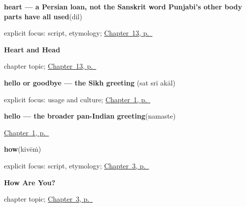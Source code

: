 \noindent\begin{minipage}[t]{\linewidth}
\raggedright
\textbf{heart — a Persian loan, not the Sanskrit word Punjabi's other body parts have all used}\enspace\emph{}\enspace(dil)\par
\footnotesize explicit focus: script, etymology; \hyperref[ch:pa-heart-and-head]{Chapter~13, p.~\pageref*{ch:pa-heart-and-head}}
\end{minipage}\par\smallskip

\noindent\begin{minipage}[t]{\linewidth}
\raggedright
\textbf{Heart and Head}\par
\footnotesize chapter topic; \hyperref[ch:pa-heart-and-head]{Chapter~13, p.~\pageref*{ch:pa-heart-and-head}}
\end{minipage}\par\smallskip

\noindent\begin{minipage}[t]{\linewidth}
\raggedright
\textbf{hello or goodbye — the Sikh greeting}\enspace\emph{  }\enspace(sat srī akāl)\par
\footnotesize explicit focus: usage and culture; \hyperref[ch:greetings]{Chapter~1, p.~\pageref*{ch:greetings}}
\end{minipage}\par\smallskip

\noindent\begin{minipage}[t]{\linewidth}
\raggedright
\textbf{hello — the broader pan-Indian greeting}\enspace\emph{}\enspace(namaste)\par
\footnotesize \hyperref[ch:greetings]{Chapter~1, p.~\pageref*{ch:greetings}}
\end{minipage}\par\smallskip

\noindent\begin{minipage}[t]{\linewidth}
\raggedright
\textbf{how}\enspace\emph{}\enspace(kivēṁ)\par
\footnotesize explicit focus: script, etymology; \hyperref[ch:responding]{Chapter~3, p.~\pageref*{ch:responding}}
\end{minipage}\par\smallskip

\noindent\begin{minipage}[t]{\linewidth}
\raggedright
\textbf{How Are You?}\par
\footnotesize chapter topic; \hyperref[ch:responding]{Chapter~3, p.~\pageref*{ch:responding}}
\end{minipage}\par\smallskip

